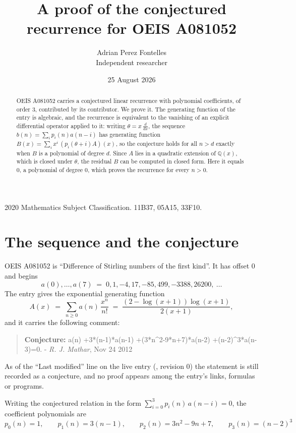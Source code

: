 \documentclass[11pt,a4paper]{article}
\title{A proof of the conjectured recurrence for OEIS A081052}
\author{Adrian Perez Fontelles\\ \small Independent researcher}
\date{25 August 2026}
\theoremstyle{plain}
\theoremstyle{definition}
\begin{document}
\maketitle

\begin{abstract}
OEIS A081052 carries a conjectured linear recurrence with polynomial coefficients, of
order 3, contributed by its contributor. We prove it. The generating function of the
entry is algebraic, and the recurrence is equivalent to the vanishing of an explicit
differential operator applied to it: writing $\theta=x\,\frac{d}{dx}$, the sequence
$b(n)=\sum_{i}p_{i}(n)a(n-i)$ has generating function
$B(x)=\sum_{i}x^{i}\,(p_{i}(\theta+i)A)(x)$, so the conjecture holds for all $n>d$ exactly
when $B$ is a polynomial of degree $d$. Since $A$ lies in a quadratic extension of
$\mathbb{Q}(x)$, which is closed under $\theta$, the residual $B$ can be computed in
closed form. Here it equals $0$, a polynomial of degree $0$, which proves
the recurrence for every $n>0$.
\end{abstract}

\noindent\small 2020 Mathematics Subject Classification. 11B37, 05A15, 33F10.\normalsize

\section{The sequence and the conjecture}

OEIS A081052 is ``Difference of Stirling numbers of the first kind''. It has offset $0$ and begins
\[
a(0),\dots,a(7)\;=\;0, 1, -4, 17, -85, 499, -3388, 26200,\ \dots
\]
The entry gives the exponential generating function
\begin{equation}\label{eq:gf}
A(x)\;=\;\sum_{n\ge 0} a(n)\,\frac{x^{n}}{n!}\;=\;\frac{\left(2 - \log{\left(x + 1 \right)}\right) \log{\left(x + 1 \right)}}{2 \left(x + 1\right)} ,
\end{equation}
and it carries the following comment:
\begin{quote}\small
\textbf{Conjecture:} a(n) +3*(n-1)*a(n-1) +(3*n\^{}2-9*n+7)*a(n-2) +(n-2)\^{}3*a(n-3)=0. - \emph{R. J. Mathar}, Nov 24 2012
\end{quote}
As of the ``Last modified'' line on the live entry (, revision 0) the
statement is still recorded as a conjecture, and no proof appears among the entry's links,
formulas or programs.

Writing the conjectured relation in the form $\sum_{i=0}^{3}p_{i}(n)\,a(n-i)=0$,
the coefficient polynomials are
\[
p_{0}(n)=1,\qquad p_{1}(n)=3 \left(n - 1\right),\qquad p_{2}(n)=3 n^{2} - 9 n + 7,\qquad p_{3}(n)=\left(n - 2\right)^{3}
\]
\end{document}
